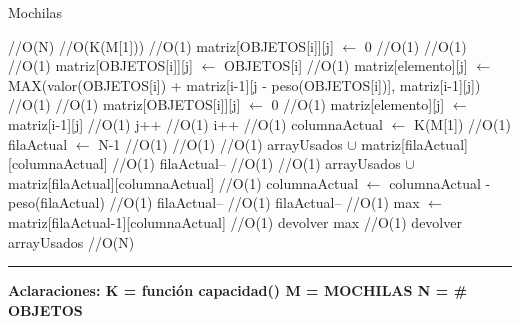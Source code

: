 \begin{algorithm}[H]
\caption{Mochilas}
\begin{algorithmic}[1]
 \hfill //O(N)
 \hfill //O(K(M[1]))
 \hfill //O(1)
\state matriz[OBJETOS[i]][j] $\gets$ 0 \hfill //O(1)
\endif
{} \hfill //O(1)
 \hfill //O(1)
\state matriz[OBJETOS[i]][j] $\gets$ OBJETOS[i] \hfill //O(1)
\Else
\state matriz[elemento][j] $\gets$ MAX(valor(OBJETOS[i]) +  \state
matriz[i-1][j - peso(OBJETOS[i])], matriz[i-1][j]) \hfill //O(1)
\endif
\Else
{} \hfill //O(1)
\state matriz[OBJETOS[i]][j] $\gets$ 0 \hfill //O(1)
\Else
\state matriz[elemento][j] $\gets$ matriz[i-1][j] \hfill //O(1)
\endif
\endif
\state j++  \hfill //O(1)
\endwhile
\state i++  \hfill //O(1)
\endwhile
\state columnaActual $\gets$ K(M[1]) \hfill //O(1)
\state filaActual $\gets$ N-1 \hfill //O(1)
 \hfill //O(1)
\hfill //O(1)
\state arrayUsados $\cup$ matriz[filaActual][columnaActual] \hfill //O(1)
\endif
\state filaActual-- \hfill //O(1)
\endif
{}\hfill //O(1)
\state arrayUsados $\cup$ matriz[filaActual][columnaActual] \hfill //O(1)
\state columnaActual $\gets$ columnaActual - peso(filaActual)  \hfill //O(1)
\state filaActual-- \hfill //O(1)
\Else
\state filaActual-- \hfill //O(1)
\endif
\endwhile
\state max $\gets$ matriz[filaActual-1][columnaActual] \hfill //O(1)
\state devolver max  \hfill //O(1)
\state devolver arrayUsados \hfill //O(N)
\EndFunction 
\end{algorithmic}
\hrule
{}
\end{algorithm}

\textbf{Aclaraciones:
K = funci\'on capacidad()
M = MOCHILAS
N = \# OBJETOS }